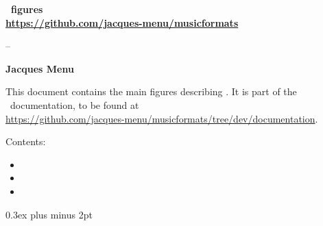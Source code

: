 \documentclass[11pt,a4paper]{report}
\begin{document}

\useFirstPageHeadersAndFooters

\setlength{\headwidth}{\textwidth}

\useListsPagesHeadersAndFooters


\begin{titlepage}
  \begin{center}
    \vspace*{2cm}

    \textbf{
      \LARGE{\mf\ figures} \\[10pt]
			\Large{\url{https://github.com/jacques-menu/musicformats}}
			}

    \vspace{0.25cm}

    \large{
			-- %
    	
		}

    \vspace{0.75cm}

    \large{\textbf{Jacques Menu}}

  \end{center}

  \vspace{1cm}

This document contains the main figures describing \mf.
It is part of the \mf\ documentation, to be found at\\
\url{https://github.com/jacques-menu/musicformats/tree/dev/documentation}.

Contents:
\begin{itemize}
\item {}

\item {}

\item {}
\end{itemize}

\end{titlepage}

{
	\small

  \setlength {\parskip} {0.3ex plus \baselineskip minus 2pt}


}
\end{document}
